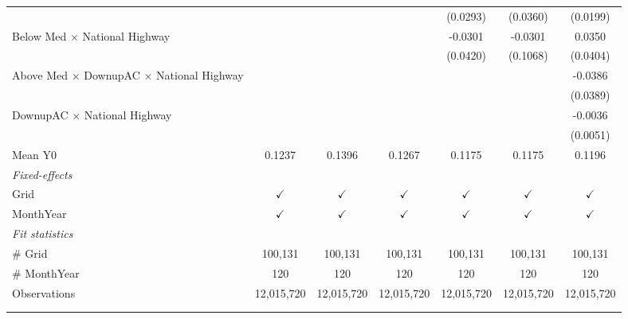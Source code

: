 \begin{table}[htbp]
\begin{tabular}{lcccccc}
                                                              &               &               &               & (0.0293)      & (0.0360)      & (0.0199)\\   
      Below Med $\times$ National Highway                     &               &               &               & -0.0301       & -0.0301       & 0.0350\\   
                                                              &               &               &               & (0.0420)      & (0.1068)      & (0.0404)\\   
      Above Med $\times$ DownupAC $\times$ National Highway   &               &               &               &               &               & -0.0386\\   
                                                              &               &               &               &               &               & (0.0389)\\   
      DownupAC $\times$ National Highway                      &               &               &               &               &               & -0.0036\\   
                                                              &               &               &               &               &               & (0.0051)\\   
      \hline Mean Y0                                          & 0.1237        & 0.1396        & 0.1267        & 0.1175        & 0.1175        & 0.1196\\  
      \midrule
      \emph{Fixed-effects}\\
      Grid                                                    & $\checkmark$  & $\checkmark$  & $\checkmark$  & $\checkmark$  & $\checkmark$  & $\checkmark$\\   
      MonthYear                                               & $\checkmark$  & $\checkmark$  & $\checkmark$  & $\checkmark$  & $\checkmark$  & $\checkmark$\\   
      \midrule
      \emph{Fit statistics}\\
      \# Grid                                                 & 100,131       & 100,131       & 100,131       & 100,131       & 100,131       & 100,131\\  
      \# MonthYear                                            & 120           & 120           & 120           & 120           & 120           & 120\\  
      Observations                                            & 12,015,720    & 12,015,720    & 12,015,720    & 12,015,720    & 12,015,720    & 12,015,720\\  
      \midrule \midrule
                                                              &               &               &               &               &               &  \tabularnewline 
      \\
   \end{tabular}
\end{table}



